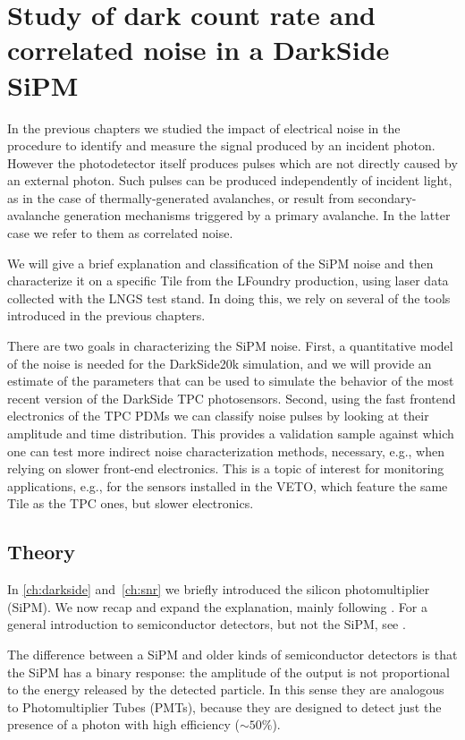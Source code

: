\chapter{Study of dark count rate and correlated noise in a DarkSide SiPM}
\label{ch:anal}

In the previous chapters we studied the impact of electrical noise in the
procedure to identify and measure the signal produced by an incident photon.
However the photodetector itself produces pulses which are not directly caused
by an external photon. Such pulses can be produced independently of incident
light, as in the case of thermally-generated avalanches, or result from
secondary-avalanche generation mechanisms triggered by a primary avalanche. In
the latter case we refer to them as correlated noise.

We will give a brief explanation and classification of the SiPM noise and then
characterize it on a specific Tile from the LFoundry production, using laser
data collected with the LNGS test stand. In doing this, we rely on several of
the tools introduced in the previous chapters.

There are two goals in characterizing the SiPM noise. First, a quantitative
model of the noise is needed for the DarkSide20k simulation, and we will
provide an estimate of the parameters that can be used to simulate the behavior
of the most recent version of the DarkSide TPC photosensors. Second, using the
fast frontend electronics of the TPC PDMs we can classify noise pulses by
looking at their amplitude and time distribution. This provides a validation
sample against which one can test more indirect noise characterization methods,
necessary, e.g., when relying on slower front-end electronics. This is a topic
of interest for monitoring applications, e.g., for the sensors installed in the
VETO, which feature the same Tile as the TPC ones, but slower electronics.

\section{Theory}
\label{sec:analtheory}

In \autoref{ch:darkside} and~\ref{ch:snr} we briefly introduced the silicon
photomultiplier (SiPM). We now recap and expand the explanation, mainly
following \cite[ch.~3]{savarese2018}. For a general introduction to
semiconductor detectors, but not the SiPM, see \cite[ch.~11]{knoll2010}.

The difference between a SiPM and older kinds of semiconductor detectors is
that the SiPM has a binary response: the amplitude of the output is not
proportional to the energy released by the detected particle. In this sense
they are analogous to Photomultiplier Tubes (PMTs), because they are designed
to detect just the presence of a photon with high efficiency ($\sim\SI{50}\%$).


